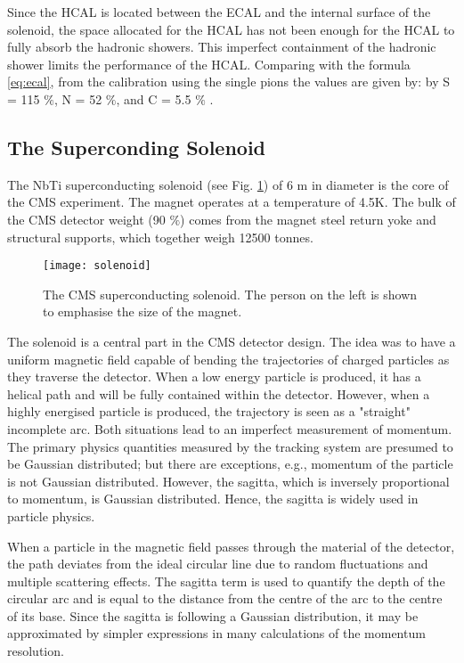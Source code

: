 \begin{normalsize}
Since the HCAL is located between the ECAL and the internal surface of the solenoid, the space allocated for the HCAL has not been enough for the HCAL to fully absorb the hadronic showers. This imperfect containment of the hadronic shower limits the performance of the HCAL. Comparing with the formula \ref{eq:ecal}, from the calibration using the single pions the values are given by:  by S = 115 $\%$, N = 52  $\%$, and C = 5.5 $\%$ \cite{Baiatian_hcal}.





\subsection{The Superconding Solenoid}


The NbTi superconducting solenoid (see Fig. \ref{solenoid}) of 6 m in diameter is the core of the CMS experiment. The magnet operates at a temperature of 4.5K. The bulk of the CMS detector weight (90 $\%$) comes from the magnet steel return yoke and structural supports, which together weigh 12500 tonnes.
 
 \begin{figure}[H]
  \centering
  \texttt{[image: solenoid]}
  \caption[The CMS superconducting solenoid]{The CMS superconducting solenoid. The person on the left is shown to emphasise the size of the magnet.}
  \label{solenoid}
\end{figure}

The solenoid is a central part in the CMS detector design. The idea was to have a uniform magnetic field capable of bending the trajectories of charged particles as they traverse the detector. When a low energy particle is produced, it has a helical path and will be fully contained within the detector. However, when a highly energised particle is produced, the trajectory is seen as a "straight" incomplete arc. Both situations lead to an imperfect measurement of momentum. The primary physics quantities measured by the tracking system are presumed to be Gaussian distributed; but there are exceptions, e.g., momentum of the particle is not Gaussian distributed. However, the sagitta, which is inversely proportional to momentum, is Gaussian distributed. Hence, the sagitta is widely used in particle physics. 

When a particle in the magnetic field passes through the material of the detector, the path deviates from the ideal circular line due to random fluctuations and multiple scattering effects. The sagitta term is used to quantify the depth of the circular arc and is equal to the distance from the centre of the arc to the centre of its base. Since the sagitta is following a Gaussian distribution, it may be approximated by simpler expressions in many calculations of the momentum resolution. 


\end{normalsize}
